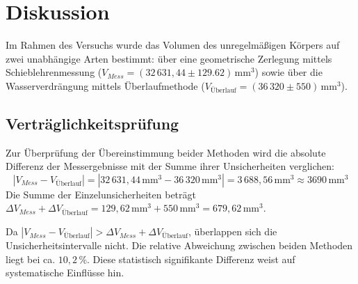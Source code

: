 \section{Diskussion}
\label{sec:Diskussion}

Im Rahmen des Versuchs wurde das Volumen des unregelmäßigen Körpers auf zwei unabhängige Arten bestimmt: über eine geometrische Zerlegung mittels Schieblehrenmessung ($V_{Mess} = (32\,631,44\pm 129.62)\,\unit{\mm\cubed}$) sowie über die Wasserverdrängung mittels Überlaufmethode ($V_{\text{Überlauf}} = (36\,320\pm 550)\,\unit{\mm\cubed}$).

\subsection{Verträglichkeitsprüfung}
Zur Überprüfung der Übereinstimmung beider Methoden wird die absolute Differenz der Messergebnisse mit der Summe ihrer Unsicherheiten verglichen:
\begin{equation}
	|V_{Mess} - V_{\text{Überlauf}}| = |32\,631{,}44\,\unit{\mm\cubed} - 36\,320\,\unit{\mm\cubed}| = 3\,688{,}56\,\unit{\mm\cubed} \approx 3690\,\unit{\mm\cubed}
\end{equation}
Die Summe der Einzelunsicherheiten beträgt $\Delta V_{Mess} + \Delta V_{\text{Überlauf}} = 129{,}62\,\unit{\mm\cubed} + 550\,\unit{\mm\cubed} = 679{,}62\,\unit{\mm\cubed}$.

\noindent Da $|V_{Mess} - V_{\text{Überlauf}}| > \Delta V_{Mess} + \Delta V_{\text{Überlauf}}$, überlappen sich die Unsicherheitsintervalle nicht. Die relative Abweichung zwischen beiden Methoden liegt bei ca. $10{,}2\,\%$. Diese statistisch signifikante Differenz weist auf systematische Einflüsse hin.

